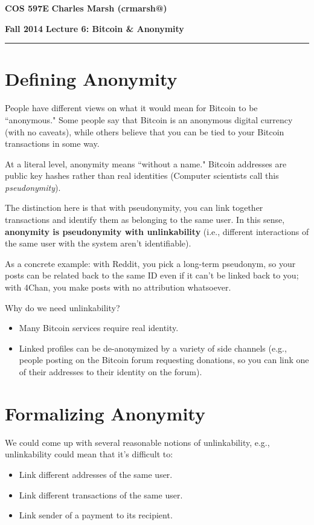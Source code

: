 \documentclass[12pt]{article}
\makeatletter
\newcommand{\myheader}[4]
{\vspace*{-0.5in}
\noindent
{#1} \hfill {#3}

\noindent
{#2} \hfill {#4}

\noindent
\rule[8pt]{\textwidth}{1pt}

\vspace{1ex} 
}  %
\newcommand{\myalgsheader}[0]
{\myheader
{ {\bf{COS 597E}} }
{ {\bf{Fall 2014}} }
{ {\bf{Charles Marsh (crmarsh@)}} }
{ {\bf{Lecture 6: Bitcoin \& Anonymity}} }
}
\makeatother
\begin{document}
\myalgsheader

\pagestyle{plain}


\section*{Defining Anonymity}

People have different views on what it would mean for Bitcoin to be ``anonymous."  Some people say that Bitcoin is an anonymous digital currency (with no caveats), while others believe that you can be tied to your Bitcoin transactions in some way.

At a literal level, anonymity means ``without a name." Bitcoin addresses are public key hashes rather than real identities (Computer scientists call this \textit{pseudonymity}).

The distinction here is that with pseudonymity, you can link together transactions and identify them as belonging to the same user. In this sense, \textbf{anonymity is pseudonymity with unlinkability} (i.e., different interactions of the same user with the system aren't identifiable).

As a concrete example: with Reddit, you pick a long-term pseudonym, so your posts can be related back to the same ID even if it can't be linked back to you; with 4Chan, you make posts with no attribution whatsoever.

Why do we need unlinkability?
\begin{itemize}
\item Many Bitcoin services require real identity.
\item Linked profiles can be de-anonymized by a variety of side channels (e.g., people posting on the Bitcoin forum requesting donations, so you can link one of their addresses to their identity on the forum).
\end{itemize}

\section*{Formalizing Anonymity}

We could come up with several reasonable notions of unlinkability, e.g., unlinkability could mean that it's difficult to:
\begin{itemize}
\item Link different addresses of the same user.
\item Link different transactions of the same user.
\item Link sender of a payment to its recipient.
\end{itemize}
\end{document}
